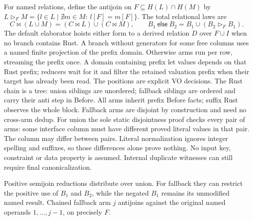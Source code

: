 For named relations, define the antijoin on $F\subseteq H(L)\cap H(M)$ by
$L\mathbin{\triangleright_F}M=\{l\in L\mid\nexists m\in M:\ l[F]=m[F]\}$.
The total relational laws are
\[
 C\bowtie(L\cup M)=(C\bowtie L)\cup(C\bowtie M),\qquad
 B_1\ \mathsf{else}\ B_2=B_1\cup(B_2\mathbin{\triangleright_F}B_1).
\]
The default elaborator hoists either form to a derived relation $D$ over
$F\cup I$ when no branch contains Rust. A branch without generators for some free columns uses
a named finite projection of the prefix domain. Otherwise arms run per row,
streaming the prefix once. A domain containing prefix let values depends on
that Rust prefix; reducers wait for it and filter the retained valuation prefix
when their target has already been read. The positions are explicit VO decisions.
The Rust chain is a tree: union siblings are
unordered; fallback siblings are ordered and carry their anti step in Before.
All arms inherit prefix Before facts; suffix Rust observes the whole block.
Fallback arms are disjoint by construction and need no cross-arm dedup.
For union the sole static disjointness proof checks every pair of arms:
some interface column must have different proved literal values in that pair.
The column may differ between pairs. Literal normalization ignores integer
spelling and suffixes, so those differences alone prove nothing. No input key,
constraint or data property is assumed. Internal duplicate witnesses can still require
final canonicalization.

Positive semijoin reductions distribute over union. For fallback they can
restrict the positive use of $B_1$ and $B_2$, while the negated $B_1$ remains
its unmodified named result. Chained fallback arm $j$ antijoins against the
original named operands $1,\ldots,j-1$, on precisely $F$.

